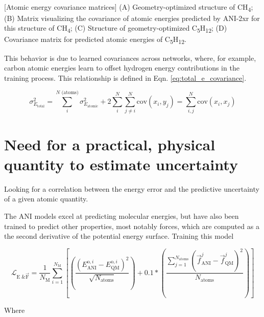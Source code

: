 \begin{flushleft}
\begin{multiFigure}
     \\
[Atomic energy covariance matrices]{
(A) Geometry-optimized structure of CH\textsubscript{4}; 
(B) Matrix visualizing the covariance of atomic energies predicted by ANI-2xr for this structure of CH\textsubscript{4}; 
(C) Structure of geometry-optimized C\textsubscript{5}H\textsubscript{12}; 
(D) Covariance matrix for predicted atomic energies of C\textsubscript{5}H\textsubscript{12}.}
\label{fig:ch4_covariance}
\end{multiFigure}
\end{flushleft}

This behavior is due to learned covariances across networks, where, for example, carbon atomic energies learn to offset hydrogen energy contributions in the training process. This relationship is defined in Eqn. \ref{eq:total_e_covariance}.

\begin{equation}
    \sigma_{E_{\text{total}}}^2 = \sum_i^{N \text{ (atoms)}} \sigma_{E_{\text{atomic}}}^2 + 2 \sum_i^N \sum_{j \neq i}^N \text{cov}(x_i, y_j) = \sum_{i,j}^N \text{cov}(x_i, x_j)
    \label{eq:total_e_covariance}
\end{equation}


\section{Need for a practical, physical quantity to estimate uncertainty}
\label{sec:practical_physical_quantity_for_uncertainty}

Looking for a correlation between the energy error and the predictive uncertainty of a given atomic quantity.

The ANI models excel at predicting molecular energies, but have also been trained to predict other properties, most notably forces, which are computed as a the second derivative of the potential energy surface. 
Training this model 


\begin{equation}
\mathcal{L}_{\text{E \& }\vec{\text{F}}} = 
\frac{1}{N_{\text{M}}} 
\sum_{i=1}^{N_\text{M}} 
\left[ \left( \frac{
\left( E_{\text{ANI}}^{\text{o},i} - E_{\text{QM}}^{\text{o},i} \right)^2}
{\sqrt{N_{\text{atoms}}}} \right)
+ 0.1 \ast \left( 
\frac{\sum_{j=1}^{N_{\text{atoms}}} 
\left( \vec{f}_{\text{ANI}}^{j} - \vec{f}_{\text{QM}}^{j}\right)^2}{N_{\text{atoms}}} 
\right) \right]
\end{equation}

Where 


